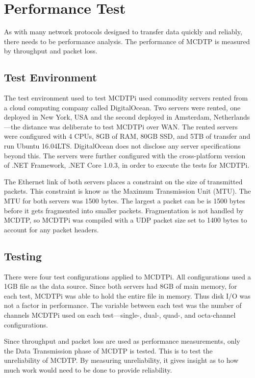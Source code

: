 \chapter{Performance Test}

As with many network protocols designed to transfer data quickly and reliably, there needs to be performance analysis. The performance of MCDTP is measured by throughput and packet loss.

\section{Test Environment}

The test environment used to test MCDTPi used commodity servers rented from a cloud computing company called DigitalOcean. Two servers were rented, one deployed in New York, USA and the second deployed in Amsterdam, Netherlands---the distance was deliberate to test MCDTPi over WAN. The rented servers were configured with 4 CPUs, 8GB of RAM, 80GB SSD, and 5TB of transfer and run Ubuntu 16.04LTS. DigitalOcean does not disclose any server specifications beyond this. The servers were further configured with the cross-platform version of .NET Framework, .NET Core 1.0.3, in order to execute the tests for MCDTPi.

The Ethernet link of both servers places a constraint on the size of transmitted packets. This constraint is know as the Maximum Transmission Unit (MTU). The MTU for both servers was 1500 bytes. The largest a packet can be is 1500 bytes before it gets fragmented into smaller packets. Fragmentation is not handled by MCDTP, so MCDTPi was compiled with a UDP packet size set to 1400 bytes to account for any packet headers.

\section{Testing}

There were four test configurations applied to MCDTPi. All configurations used a 1GB file as the data source. Since both servers had 8GB of main memory, for each test, MCDTPi was able to hold the entire file in memory. Thus disk I/O was not a factor in performance. The variable between each test was the number of channels MCDTPi used on each test---single-, dual-, quad-, and octa-channel configurations.

Since throughput and packet loss are used as performance measurements, only the Data Transmission phase of MCDTP is tested. This is to test the unreliability of MCDTP. By measuring unreliability, it gives insight as to how much work would need to be done to provide reliability.

